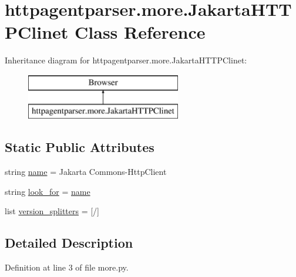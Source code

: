 \hypertarget{classhttpagentparser_1_1more_1_1_jakarta_h_t_t_p_clinet}{}\section{httpagentparser.\+more.\+Jakarta\+H\+T\+T\+P\+Clinet Class Reference}
\label{classhttpagentparser_1_1more_1_1_jakarta_h_t_t_p_clinet}
Inheritance diagram for httpagentparser.\+more.\+Jakarta\+H\+T\+T\+P\+Clinet\+:\begin{figure}[H]
\begin{center}
\leavevmode
\includegraphics[height=2.000000cm]{classhttpagentparser_1_1more_1_1_jakarta_h_t_t_p_clinet}
\end{center}
\end{figure}
\subsection*{Static Public Attributes}
\begin{DoxyCompactItemize}
\item 
string \hyperlink{classhttpagentparser_1_1more_1_1_jakarta_h_t_t_p_clinet_a1e43a9fff6983482028d4a2377c23ca2}{name} = \textquotesingle{}Jakarta Commons-\/Http\+Client\textquotesingle{}
\item 
string \hyperlink{classhttpagentparser_1_1more_1_1_jakarta_h_t_t_p_clinet_ab53743027dffa00d48b327f9eab0c248}{look\+\_\+for} = \hyperlink{classhttpagentparser_1_1more_1_1_jakarta_h_t_t_p_clinet_a1e43a9fff6983482028d4a2377c23ca2}{name}
\item 
list \hyperlink{classhttpagentparser_1_1more_1_1_jakarta_h_t_t_p_clinet_a94934d3d61f4cb78fd578ea63afe0221}{version\+\_\+splitters} = \mbox{[}\textquotesingle{}/\textquotesingle{}\mbox{]}
\end{DoxyCompactItemize}


\subsection{Detailed Description}


Definition at line 3 of file more.\+py.



